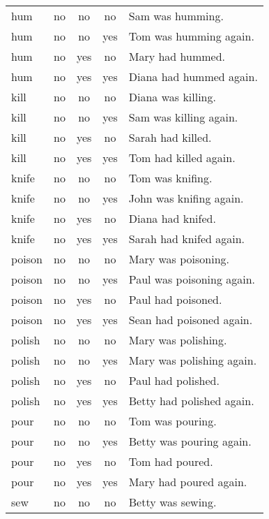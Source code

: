 \begin{longtable}{l|ccc|p{5cm}}
hum       & no   & no   & no   & Sam was humming.            \\
hum       & no   & no   & yes  & Tom was humming again.      \\
hum       & no   & yes  & no   & Mary had hummed.            \\
hum       & no   & yes  & yes  & Diana had hummed again.     \\
kill      & no   & no   & no   & Diana was killing.          \\
kill      & no   & no   & yes  & Sam was killing again.      \\
kill      & no   & yes  & no   & Sarah had killed.           \\
kill      & no   & yes  & yes  & Tom had killed again.       \\
knife     & no   & no   & no   & Tom was knifing.            \\
knife     & no   & no   & yes  & John was knifing again.     \\
knife     & no   & yes  & no   & Diana had knifed.           \\
knife     & no   & yes  & yes  & Sarah had knifed again.     \\
poison    & no   & no   & no   & Mary was poisoning.         \\
poison    & no   & no   & yes  & Paul was poisoning again.   \\
poison    & no   & yes  & no   & Paul had poisoned.          \\
poison    & no   & yes  & yes  & Sean had poisoned again.    \\
polish    & no   & no   & no   & Mary was polishing.         \\
polish    & no   & no   & yes  & Mary was polishing again.   \\
polish    & no   & yes  & no   & Paul had polished.          \\
polish    & no   & yes  & yes  & Betty had polished again.   \\
pour      & no   & no   & no   & Tom was pouring.            \\
pour      & no   & no   & yes  & Betty was pouring again.    \\
pour      & no   & yes  & no   & Tom had poured.             \\
pour      & no   & yes  & yes  & Mary had poured again.      \\
sew       & no   & no   & no   & Betty was sewing.           \\

\end{longtable}
